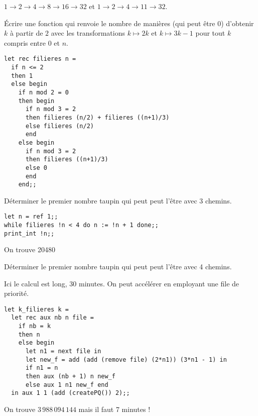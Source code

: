 $1 \rightarrow 2 \rightarrow 4 \rightarrow 8 \rightarrow 16 \rightarrow 32$ et
$1 \rightarrow 2 \rightarrow 4 \rightarrow 11 \rightarrow 32$.
\begin{Exercise}[title=Nombre de filières]
Écrire une fonction  qui renvoie le nombre de manières (qui peut être 0) d'obtenir $k$ à partir de $2$ avec les transformations $k \mapsto 2k$ et $k \mapsto 3k-1$ pour tout $k$ compris entre 0 et $n$.
\end{Exercise}
\begin{Answer}
\begin{lstlisting}
let rec filieres n =
  if n <= 2
  then 1
  else begin
    if n mod 2 = 0
    then begin
      if n mod 3 = 2 
      then filieres (n/2) + filieres ((n+1)/3)
      else filieres (n/2) 
      end
    else begin
      if n mod 3 = 2
      then filieres ((n+1)/3)
      else 0
      end
    end;;           
\end{lstlisting}
\end{Answer}
\begin{Exercise}[title=3 filières]
Déterminer le premier nombre taupin qui peut peut l'être avec 3 chemins.
\end{Exercise}
\begin{Answer}
\begin{lstlisting}
let n = ref 1;;
while filieres !n < 4 do n := !n + 1 done;;
print_int !n;;
\end{lstlisting}

On trouve 20480
\end{Answer}
\begin{Exercise}[title=4 filières]
Déterminer le premier nombre taupin qui peut peut l'être avec 4 chemins.
\end{Exercise}
\begin{Answer}
Ici le calcul est long, 30 minutes. On peut accélérer en employant une file de priorité.
\begin{lstlisting}
let k_filieres k = 
  let rec aux nb n file =
    if nb = k
    then n
    else begin
      let n1 = next file in
      let new_f = add (add (remove file) (2*n1)) (3*n1 - 1) in
      if n1 = n
      then aux (nb + 1) n new_f
      else aux 1 n1 new_f end
  in aux 1 1 (add (createPQ()) 2);;
  \end{lstlisting}

On trouve $3\,988\,094\,144$ mais il faut 7 minutes !
\end{Answer}

